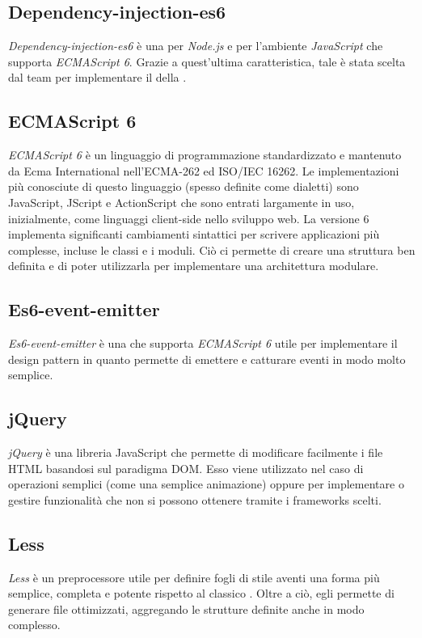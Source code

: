 \subsection{Dependency-injection-es6}
\textit{Dependency-injection-es6} è una  per \textit{Node.js} e  per l'ambiente \textit{JavaScript} che supporta \textit{ECMAScript 6}. Grazie a quest'ultima caratteristica, tale  è stata scelta dal team per implementare il  della .

\subsection{ECMAScript 6}
\textit{ECMAScript 6} è un linguaggio di programmazione standardizzato e mantenuto da Ecma International nell'ECMA-262 ed ISO/IEC 16262. Le implementazioni più conosciute di questo linguaggio (spesso definite come dialetti) sono JavaScript, JScript e ActionScript che sono entrati largamente in uso, inizialmente, come linguaggi client-side nello sviluppo web. La versione 6 implementa significanti cambiamenti sintattici per scrivere applicazioni più complesse, incluse le classi e i moduli. Ciò ci permette di creare una struttura ben definita e di poter utilizzarla per implementare una architettura modulare.

\subsection{Es6-event-emitter}
\textit{Es6-event-emitter} è una  che supporta \textit{ECMAScript 6} utile per implementare il design pattern  in quanto permette di emettere e catturare eventi in modo molto semplice.

\subsection{jQuery}
\textit{jQuery} è una libreria JavaScript che permette di modificare facilmente i file HTML basandosi sul paradigma DOM. Esso viene utilizzato nel caso di operazioni semplici (come una semplice animazione) oppure per implementare o gestire funzionalità che non si possono ottenere tramite i frameworks scelti.

\subsection{Less}
\textit{Less} è un preprocessore  utile per definire fogli di stile aventi una forma più semplice, completa e potente rispetto al classico . Oltre a ciò, egli permette di generare file  ottimizzati, aggregando le strutture definite anche in modo complesso.

